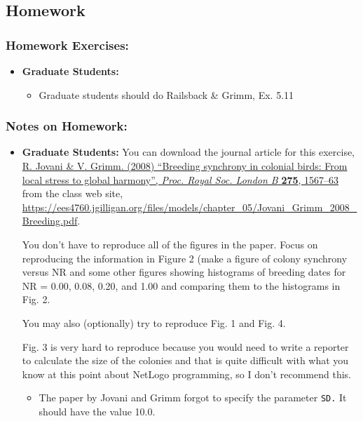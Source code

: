 \documentclass[
]{article}
\providecommand{\tightlist}{%
  \setlength{\itemsep}{0pt}\setlength{\parskip}{0pt}}
\begin{document}
\subsection{Homework}\label{homework-5}

\subsubsection{Homework Exercises:}\label{homework-exercises-5}

\begin{itemize}
\item
  \textbf{Graduate Students:}

  \begin{itemize}
  \tightlist
  \item
    Graduate students should do Railsback \& Grimm, Ex. 5.11
  \end{itemize}
\end{itemize}

\subsubsection{Notes on Homework:}\label{notes-on-homework-3}

\begin{itemize}
\item
  \textbf{Graduate Students:} You can download the journal article for
  this exercise,
  \href{/files/models/chapter_05/Jovani_Grimm_2008_Breeding.pdf}{R.
  Jovani \& V. Grimm. (2008) ``Breeding synchrony in colonial birds:
  From local stress to global harmony'', \emph{Proc. Royal Soc. London
  B} \textbf{275}, 1567--63} from the class web site,
  \url{https://ees4760.jgilligan.org/files/models/chapter_05/Jovani_Grimm_2008_Breeding.pdf}.

  You don't have to reproduce all of the figures in the paper. Focus on
  reproducing the information in Figure 2 (make a figure of colony
  synchrony versus NR and some other figures showing histograms of
  breeding dates for NR = 0.00, 0.08, 0.20, and 1.00 and comparing them
  to the histograms in Fig. 2.

  You may also (optionally) try to reproduce Fig. 1 and Fig. 4.

  Fig. 3 is very hard to reproduce because you would need to write a
  reporter to calculate the size of the colonies and that is quite
  difficult with what you know at this point about NetLogo programming,
  so I don't recommend this.

  \begin{itemize}
  \tightlist
  \item
    The paper by Jovani and Grimm forgot to specify the parameter
    \texttt{SD.} It should have the value 10.0.
  \end{itemize}
\end{itemize}
\end{document}
